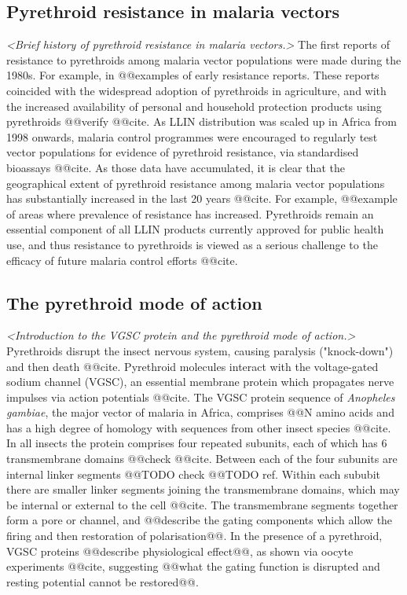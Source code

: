 \documentclass[a4paper,11pt,abstracton,hidelinks]{scrartcl}
\begin{document}
\subsection*{Pyrethroid resistance in malaria vectors}


\textit{<Brief history of pyrethroid resistance in malaria vectors.>}
%
The first reports of resistance to pyrethroids among malaria vector populations were made during the 1980s.
%
For example, in @@examples of early resistance reports.
%
These reports coincided with the widespread adoption of pyrethroids in agriculture, and with the increased availability of personal and household protection products using pyrethroids @@verify @@cite.
%
As LLIN distribution was scaled up in Africa from 1998 onwards, malaria control programmes were encouraged to regularly test vector populations for evidence of pyrethroid resistance, via standardised bioassays @@cite.
%
As those data have accumulated, it is clear that the geographical extent of pyrethroid resistance among malaria vector populations has substantially increased in the last 20 years @@cite.
%
For example, @@example of areas where prevalence of resistance has increased.
%
Pyrethroids remain an essential component of all LLIN products currently approved for public health use, and thus resistance to pyrethroids is viewed as a serious challenge to the efficacy of future malaria control efforts @@cite.


\subsection*{The pyrethroid mode of action}


\textit{<Introduction to the VGSC protein and the pyrethroid mode of action.>}
%
Pyrethroids disrupt the insect nervous system, causing paralysis ("knock-down") and then death @@cite.
%
Pyrethroid molecules interact with the voltage-gated sodium channel (VGSC), an essential membrane protein which propagates nerve impulses via action potentials @@cite.
%
The VGSC protein sequence of \textit{Anopheles gambiae}, the major vector of malaria in Africa, comprises @@N amino acids and has a high degree of homology with sequences from other insect species @@cite.
%
In all insects the protein comprises four repeated subunits, each of which has 6 transmembrane domains @@check @@cite.
%
Between each of the four subunits are internal linker segments @@TODO check @@TODO ref.
%
Within each sububit there are smaller linker segments joining the transmembrane domains, which may be internal or external to the cell @@cite.
%
The transmembrane segments together form a pore or channel, and @@describe the gating components which allow the firing and then restoration of polarisation@@.
%
In the presence of a pyrethroid, VGSC proteins @@describe physiological effect@@, as shown via oocyte experiments @@cite, suggesting @@what the gating function is disrupted and resting potential cannot be restored@@.
\end{document}
